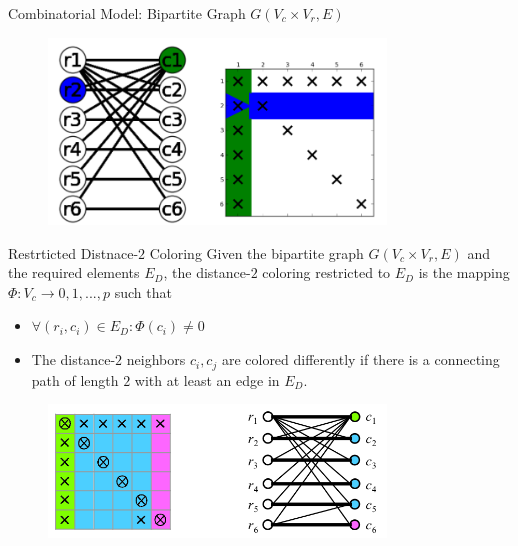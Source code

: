 \documentclass{beamer}
\begin{document}
\begin{frame}{Combinatorial Model: Bipartite Graph}
$G(V_c\times V_r,E)$
\begin{figure}
\centering
\includegraphics[width=0.8\textwidth]{bip}
\end{figure}
\end{frame}

\begin{frame}{Restrticted Distnace-$2$ Coloring}
Given the bipartite graph $G(V_c\times V_r,E)$ and the required elements
$E_D$, the distance-$2$ coloring restricted to $E_D$ is the mapping 
$\Phi:V_c\to {0,1,...,p}$ such that
\begin{itemize}
\item $\forall (r_i,c_i)\in E_D:\Phi(c_i)\neq 0$
\item The distance-$2$ neighbors $c_i, c_j$ are colored differently
if there is a connecting path of length $2$ with at least an edge in $E_D$.
\end{itemize}
\begin{figure}
\centering
\includegraphics[width=0.8\textwidth]{restricted_distance2}
\end{figure}
\end{frame}
\end{document}
